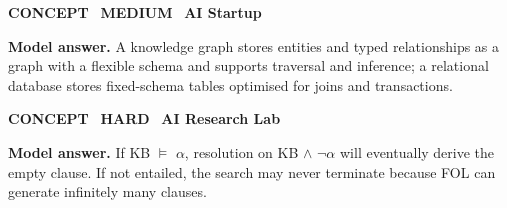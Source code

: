 \documentclass[11pt]{article}
\begin{document}
\begin{tcolorbox}[enhanced,breakable,colback=white,colframe=teal,arc=2mm,boxrule=0.8pt,left=3mm,right=3mm,
 title={\textbf{QIII.04}\quad What is the difference between a knowledge graph and a relational database?},fonttitle=\color{white}\small,colbacktitle=teal]
\colorbox{teal!15}{\scriptsize\bfseries\color{teal} CONCEPT}\
\colorbox{gold!85!black!15}{\scriptsize\bfseries\color{gold!85!black} MEDIUM}\
\colorbox{navy!8}{\scriptsize\bfseries\color{navy} AI Startup}\par\smallskip
\textbf{\color{navy}Model answer.} A knowledge graph stores entities and typed relationships as a graph with a flexible schema and supports traversal and inference; a relational database stores fixed-schema tables optimised for joins and transactions.
\end{tcolorbox}
\begin{tcolorbox}[enhanced,breakable,colback=white,colframe=teal,arc=2mm,boxrule=0.8pt,left=3mm,right=3mm,
 title={\textbf{QIII.05}\quad Why is resolution refutation-complete but FOL entailment only semi-decidable?},fonttitle=\color{white}\small,colbacktitle=teal]
\colorbox{teal!15}{\scriptsize\bfseries\color{teal} CONCEPT}\
\colorbox{crimson!15}{\scriptsize\bfseries\color{crimson} HARD}\
\colorbox{navy!8}{\scriptsize\bfseries\color{navy} AI Research Lab}\par\smallskip
\textbf{\color{navy}Model answer.} If KB $\models$ $\alpha$, resolution on KB $\wedge$ $\neg$$\alpha$ will eventually derive the empty clause. If not entailed, the search may never terminate because FOL can generate infinitely many clauses.
\end{tcolorbox}
\end{document}
